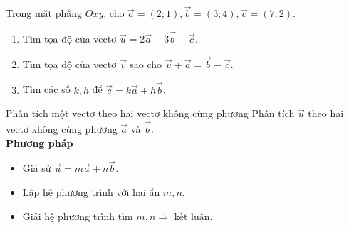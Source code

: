 \begin{vd}%
    Trong mặt phẳng $Oxy$, cho $\vec{a}=\left(2; 1\right), \vec{b}=\left(3; 4\right), \vec{c}=\left(7; 2\right)$.
    \begin{enumerate}
        \item Tìm tọa độ của vectơ $\vec{u}=2\vec{a} - 3\vec{b} + \vec{c}$. 
        \item Tìm tọa độ của vectơ $\vec{v}$ sao cho $\vec{v} + \vec{a}=\vec{b} - \vec{c}$. 
        \item Tìm các số $k, h$ để $\vec{c}=k\vec{a} + h\vec{b}$. 
    \end{enumerate}
\end{vd}
\begin{dang}{Phân tích một vectơ theo hai vectơ không cùng phương}
    Phân tích $\vec{u}$ theo hai vectơ không cùng phương $\vec{a}$ và $\vec{b}$.\\
    \textbf{Phương pháp}
    \begin{itemize}
        \item Giả sử $\vec{u}=m\vec{a}+n\vec{b}$.
        \item Lập hệ phương trình với hai ẩn $m,n$.
        \item Giải hệ phương trình tìm $m,n \Rightarrow$ kết luận.
    \end{itemize}
\end{dang}
